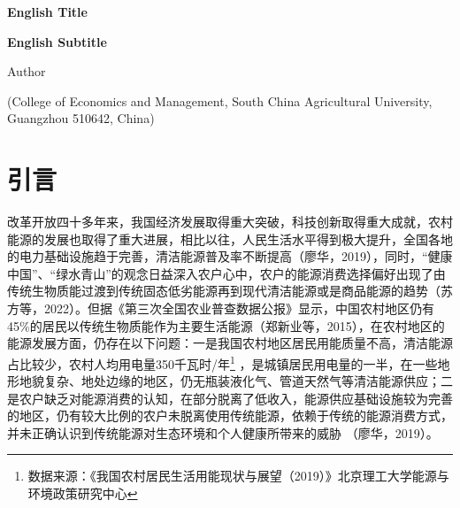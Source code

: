 \documentclass[a4paper, 12pt, oneside]{article} %
\begin{document}
	\newpage
	\begin{center}
		{\textbf{\large{English Title}}} 
		
		{\textbf{\large{English Subtitle}}}
		
		Author
		
		(College of Economics and Management, South China Agricultural University, Guangzhou 510642, China)
	\end{center}
		
			
		
	\newpage
	\setcounter{page}{1}
	\begin{titlepage}
		\tableofcontents %
	\end{titlepage}
	\newpage
	\setcounter{page}{1}
	\section{引言}
	改革开放四十多年来，我国经济发展取得重大突破，科技创新取得重大成就，农村能源的发展也取得了重大进展，相比以往，人民生活水平得到极大提升，全国各地的电力基础设施趋于完善，清洁能源普及率不断提高（廖华，2019），同时，“健康中国”、“绿水青山”的观念日益深入农户心中，农户的能源消费选择偏好出现了由传统生物质能过渡到传统固态低劣能源再到现代清洁能源或是商品能源的趋势（苏方等，2022）。但据《第三次全国农业普查数据公报》显示，中国农村地区仍有45\%的居民以传统生物质能作为主要生活能源（郑新业等，2015），在农村地区的能源发展方面，仍存在以下问题：一是我国农村地区居民用能质量不高，清洁能源占比较少，农村人均用电量350千瓦时/年\footnote{数据来源：《我国农村居民生活用能现状与展望（2019）》北京理工大学能源与环境政策研究中心} ，是城镇居民用电量的一半，在一些地形地貌复杂、地处边缘的地区，仍无瓶装液化气、管道天然气等清洁能源供应；二是农户缺乏对能源消费的认知，在部分脱离了低收入，能源供应基础设施较为完善的地区，仍有较大比例的农户未脱离使用传统能源，依赖于传统的能源消费方式，并未正确认识到传统能源对生态环境和个人健康所带来的威胁 （廖华，2019）。
	
\end{document}
